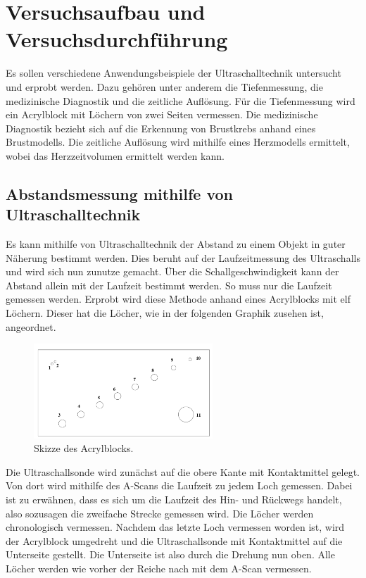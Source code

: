 


\section{Versuchsaufbau und Versuchsdurchführung}

Es sollen verschiedene Anwendungsbeispiele der Ultraschalltechnik untersucht und erprobt werden.
Dazu gehören unter anderem die Tiefenmessung, die medizinische Diagnostik und die zeitliche Auflösung.
Für die Tiefenmessung wird ein Acrylblock mit Löchern von zwei Seiten vermessen. Die medizinische 
Diagnostik bezieht sich auf die Erkennung von Brustkrebs anhand eines Brustmodells. Die zeitliche 
Auflösung wird mithilfe eines Herzmodells ermittelt, wobei das Herzzeitvolumen ermittelt werden kann.

\subsection{Abstandsmessung mithilfe von Ultraschalltechnik}
Es kann mithilfe von Ultraschalltechnik der Abstand zu einem Objekt in guter Näherung bestimmt werden. 
Dies beruht auf der Laufzeitmessung des Ultraschalls und wird sich nun zunutze gemacht. Über die 
Schallgeschwindigkeit kann der Abstand allein mit der Laufzeit bestimmt werden. So muss nur die 
Laufzeit gemessen werden. Erprobt wird diese Methode anhand eines Acrylblocks mit elf Löchern. Dieser 
hat die Löcher, wie in der folgenden Graphik zusehen ist, angeordnet.

\begin{figure}[H]
    \centering
    \includegraphics[width=0.6\textwidth]{Acrylblock.png}
    \caption{Skizze des Acrylblocks.}
\end{figure}

Die Ultraschallsonde wird zunächst auf die obere Kante mit Kontaktmittel gelegt. Von dort wird mithilfe 
des A-Scans die Laufzeit zu jedem Loch gemessen. Dabei ist zu erwähnen, dass es sich um die Laufzeit 
des Hin- und Rückwegs handelt, also sozusagen die zweifache Strecke gemessen wird. Die Löcher werden 
chronologisch vermessen. Nachdem das letzte Loch vermessen worden ist, wird der Acrylblock umgedreht 
und die Ultraschallsonde mit Kontaktmittel auf die Unterseite gestellt. Die Unterseite ist also durch 
die Drehung nun oben. Alle Löcher werden wie vorher der Reiche nach mit dem A-Scan vermessen. \\

